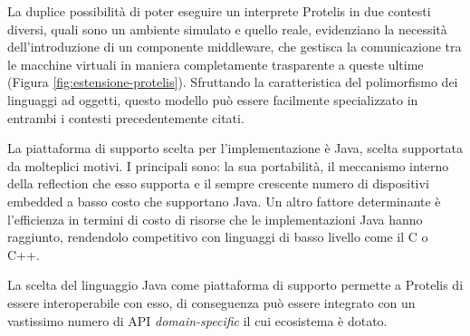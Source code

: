 La duplice possibilità di poter eseguire un interprete Protelis in due contesti
diversi, quali sono un ambiente simulato e quello reale, evidenziano la
necessità dell'introduzione di un componente middleware, che gestisca la
comunicazione tra le macchine virtuali in maniera completamente trasparente a
queste ultime (Figura \ref{fig:estensione-protelis}). Sfruttando la
caratteristica del polimorfismo dei linguaggi ad oggetti, questo modello può
essere facilmente specializzato in entrambi i contesti precedentemente citati.

La piattaforma di supporto scelta per l'implementazione è Java, scelta
supportata da molteplici motivi\cite{Protelis}. I principali sono: la sua
portabilità, il meccanismo interno della reflection che esso supporta e il
sempre crescente numero di dispositivi embedded a basso costo che supportano
Java. Un altro fattore determinante è l'efficienza in termini di costo di
risorse che le implementazioni Java hanno raggiunto, rendendolo competitivo con
linguaggi di basso livello come il C o C++.

La scelta del linguaggio Java come piattaforma di supporto permette a Protelis
di essere interoperabile con esso, di conseguenza può essere integrato con un
vastissimo numero di API \textit{domain-specific} il cui ecosistema è dotato.
